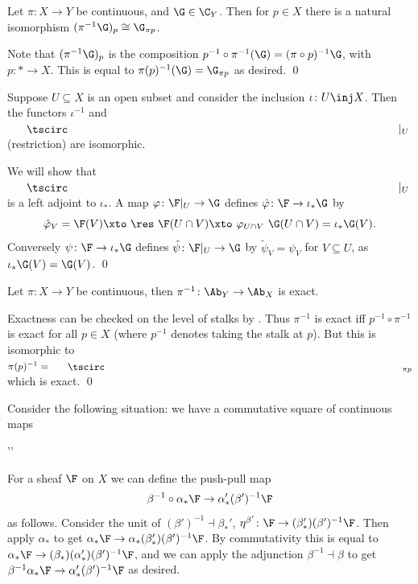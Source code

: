 \enote

\bcoro[name={stalkofinv}]

    Let $\pi\colon X\to Y$ be continuous, and $\G\in\C_Y$.
    Then for $p\in X$ there is a natural isomorphism $(\pi^{-1}\G)_p\cong\G_{\pi p}$.

\ecoro

\bproof

    Note that $(\pi^{-1}\G)_p$ is the composition $p^{-1}\circ\pi^{-1}(\G)=(\pi\circ p)^{-1}\G$, with $p\colon*\to X$.
    This is equal to $\pi(p)^{-1}(\G)=\G_{\pi p}$ as desired.
    \qed

\eproof

\bprop

    Suppose $U\subseteq X$ is an open subset and consider the inclusion $\iota\colon U\inj X$.
    Then the functors $\iota^{-1}$ and $\bul|_U$ (restriction) are isomorphic.

\eprop

\bproof

    We will show that $\bul|_U$ is a left adjoint to $\iota_*$.
    A map $\phi\colon\F|_U\to\G$ defines $\hat\phi\colon\F\to\iota_*\G$ by
    $$ \hat\phi_V = \F(V) \xtos\res \F(U\cap V) \xtos{\phi_{U\cap V}} \G(U\cap V) = \iota_*\G(V) . $$
    Conversely $\psi\colon\F\to\iota_*\G$ defines $\tilde\psi\colon\F|_U\to\G$ by $\tilde\psi_V=\psi_V$ for $V\subseteq U$, as $\iota_*\G(V)=\G(V)$.
    \qed

\eproof

\bprop

    Let $\pi\colon X\to Y$ be continuous, then $\pi^{-1}\colon\Ab_Y\to\Ab_X$ is exact.

\eprop

\bproof

    Exactness can be checked on the level of stalks by .
    Thus $\pi^{-1}$ is exact iff $p^{-1}\circ\pi^{-1}$ is exact for all $p\in X$ (where $p^{-1}$ denotes taking the stalk at $p$).
    But this is isomorphic to $\pi(p)^{-1}=\bul_{\pi p}$ which is exact.
    \qed

\eproof

Consider the following situation: we have a commutative square of continuous maps

    {\beta'}{\beta}{\alpha'}{\alpha}

For a sheaf $\F$ on $X$ we can define the {\emphcolor push-pull map}
$$ \beta^{-1}\circ\alpha_*\F\to\alpha_*'(\beta')^{-1}\F $$
as follows.
Consider the unit of $(\beta')^{-1}\dashv\beta_*'$, $\eta^{\beta'}\colon\F\to(\beta'_*)(\beta')^{-1}\F$.
Then apply $\alpha_*$ to get $\alpha_*\F\to\alpha_*(\beta'_*)(\beta')^{-1}\F$.
By commutativity this is equal to $\alpha_*\F\to(\beta_*)(\alpha'_*)(\beta')^{-1}\F$, and we can apply the adjunction $\beta^{-1}\dashv\beta$ to get
$\beta^{-1}\alpha_*\F\to\alpha'_*(\beta')^{-1}\F$ as desired.


